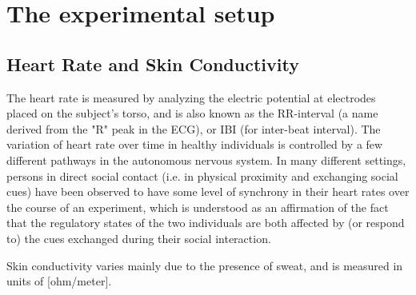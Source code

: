 \documentclass[a4paper, 11pt]{article}      %
\begin{document}
\section{The experimental setup}

\subsection{Heart Rate and Skin Conductivity}
The heart rate is measured by analyzing the electric potential at electrodes placed on the subject's torso, and is also known as the RR-interval (a name derived from the "R" peak in the ECG), or IBI (for inter-beat interval). The variation of heart rate over time in healthy individuals is controlled by a few different pathways in the autonomous nervous system. In many different settings, persons in direct social contact (i.e. in physical proximity and exchanging social cues) have been observed to have some level of synchrony in their heart rates over the course of an experiment, which is understood as an affirmation of the fact that the regulatory states of the two individuals are both affected by (or respond to) the cues exchanged during their social interaction.

Skin conductivity varies mainly due to the presence of sweat, and is measured in units of [ohm\slash meter].
\end{document}
